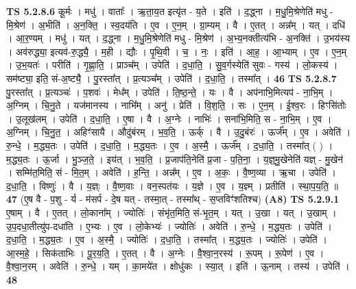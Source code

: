 \documentclass[17pt]{extarticle}
\begin{document}
                  \newline
                                \textbf{ TS 5.2.8.6} \newline
                  कू॒र्मः । मधु॑ । वाताः᳚ । ऋ॒ता॒य॒त इत्यृ॑त - य॒ते । इति॑ । द॒द्ध्ना । म॒धु॒मि॒श्रेणेति॑ मधु - मि॒श्रेण॑ । अ॒भीति॑ । अ॒न॒क्ति॒ । स्व॒दय॑ति । ए॒व । ए॒न॒म् । ग्रा॒म्यम् । वै । ए॒तत् । अन्न᳚म् । यत् । दधि॑ । आ॒र॒ण्यम् । मधु॑ । यत् । द॒द्ध्ना । म॒धु॒मि॒श्रेणेति॑ मधु - मि॒श्रेण॑ । अ॒भ्य॒नक्तीत्य॑भि - अ॒नक्ति॑ । उ॒भय॑स्य । अव॑रुद्ध्या॒ इत्यव॑-रु॒द्ध्यै॒ । म॒ही । द्यौः । पृ॒थि॒वी । च॒ । नः॒ । इति॑ । आ॒ह॒ । आ॒भ्याम् । ए॒व । ए॒न॒म् । उ॒भ॒यतः॑ । परीति॑ । गृ॒ह्णा॒ति॒ । प्राञ्च᳚म् । उपेति॑ । द॒धा॒ति॒ । सु॒व॒र्गस्येति॑ सुवः - गस्य॑ । लो॒कस्य॑ । सम॑ष्ट्या॒ इति॒ सं-अ॒ष्ट्यै॒ । पु॒रस्ता᳚त् । प्र॒त्यञ्च᳚म् । उपेति॑ । द॒धा॒ति॒ । तस्मा᳚त् । \textbf{  46} \newline
                  \newline
                                \textbf{ TS 5.2.8.7} \newline
                  पु॒रस्ता᳚त् । प्र॒त्यञ्चः॑ । प॒शवः॑ । मेध᳚म् । उपेति॑ । ति॒ष्ठ॒न्ते॒ । यः । वै । अप॑नाभि॒मित्यप॑ - ना॒भि॒म् । अ॒ग्निम् । चि॒नु॒ते । यज॑मानस्य । नाभि᳚म् । अनु॑ । प्रेति॑ । वि॒श॒ति॒ । सः । ए॒न॒म् । ई॒श्व॒रः । हिꣳसि॑तोः । उ॒लूख॑लम् । उपेति॑ । द॒धा॒ति॒ । ए॒षा । वै । अ॒ग्नेः । नाभिः॑ । सना॑भि॒मिति॒ स - ना॒भि॒म् । ए॒व । अ॒ग्निम् । चि॒नु॒त॒ । अहिꣳ॑सायै । औदु॑बंरम् । भ॒व॒ति॒ । ऊर्क् । वै । उ॒दु॒बंरः॑ । ऊर्ज᳚म् । ए॒व । अवेति॑ । रु॒न्धे॒ । म॒द्ध्य॒तः । उपेति॑ । द॒धा॒ति॒ । म॒द्ध्य॒तः । ए॒व । अ॒स्मै॒ । ऊर्ज᳚म् । द॒धा॒ति॒ । तस्मा᳚त् ( ) । म॒द्ध्य॒तः । ऊ॒र्जा । भु॒ञ्ज॒ते॒ । इय॑त् । भ॒व॒ति॒ । प्र॒जाप॑ति॒नेति॑ प्र॒जा - प॒ति॒ना॒ । य॒ज्ञ्॒मु॒खेनेति॑ यज्ञ् - मु॒खेन॑ । सम्मि॑त॒मिति॒ सं - मि॒त॒म् । अवेति॑ । ह॒न्ति॒ । अन्न᳚म् । ए॒व । अ॒कः॒ । वै॒ष्ण॒व्या । ऋ॒चा । उपेति॑ । द॒धा॒ति॒ । विष्णुः॑ । वै । य॒ज्ञ्ः । वै॒ष्ण॒वाः । वन॒स्पत॑यः । य॒ज्ञे । ए॒व । य॒ज्ञ्म् । प्रतीति॑ । स्था॒प॒य॒ति॒ ॥ \textbf{  47} \newline
                  \newline
                      (ए॒ष वै - प॒शु - र्य - म॑सर्प - दे॒ष यत् - तस्मा॒त् - तस्मा᳚थ् - स॒प्तविꣳ॑शतिश्च)  \textbf{(A8)} \newline \newline
                                \textbf{ TS 5.2.9.1} \newline
                  ए॒षाम् । वै । ए॒तत् । लो॒काना᳚म् । ज्योतिः॑ । संभृ॑त॒मिति॒ सं-भृ॒त॒म् । यत् । उ॒खा । यत् । उ॒खाम् । उ॒प॒दधा॒तीत्यु॑प-दधा॑ति । ए॒भ्यः । ए॒व । लो॒केभ्यः॑ । ज्योतिः॑ । अवेति॑ । रु॒न्धे॒ । म॒द्ध्य॒तः । उपेति॑ । द॒धा॒ति॒ । म॒द्ध्य॒तः । ए॒व । अ॒स्मै॒ । ज्योतिः॑ । द॒धा॒ति॒ । तस्मा᳚त् । म॒द्ध्य॒तः । ज्योतिः॑ । उपेति॑ । आ॒स्म॒हे॒ । सिक॑ताभिः । पू॒र॒य॒ति॒ । ए॒तत् । वै । अ॒ग्नेः । वै॒श्वा॒न॒रस्य॑ । रू॒पम् । रू॒पेण॑ । ए॒व । वै॒श्वा॒न॒रम् । अवेति॑ । रु॒न्धे॒ । यम् । का॒मये॑त । क्षोधु॑कः । स्या॒त् । इति॑ । ऊ॒नाम् । तस्य॑ । उपेति॑ । \textbf{  48} \newline
\end{document}
